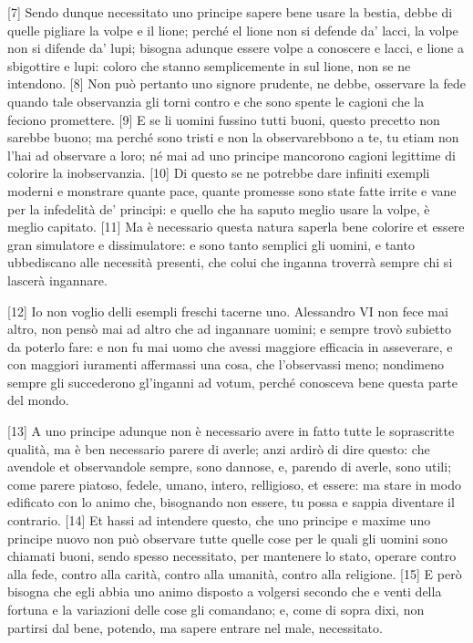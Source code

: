 {[}7{]} Sendo dunque necessitato uno principe sapere bene usare la
bestia, debbe di quelle pigliare la volpe e il lione; perché el lione
non si defende da' lacci, la volpe non si difende da' lupi; bisogna
adunque essere volpe a conoscere e lacci, e lione a sbigottire e lupi:
coloro che stanno semplicemente in sul lione, non se ne intendono.
{[}8{]} Non può pertanto uno signore prudente, ne debbe, osservare la
fede quando tale observanzia gli torni contro e che sono spente le
cagioni che la feciono promettere. {[}9{]} E se li uomini fussino tutti
buoni, questo precetto non sarebbe buono; ma perché sono tristi e non la
observarebbono a te, tu etiam non l'hai ad observare a loro; né mai ad
uno principe mancorono cagioni legittime di colorire la inobservanzia.
{[}10{]} Di questo se ne potrebbe dare infiniti exempli moderni e
monstrare quante pace, quante promesse sono state fatte irrite e vane
per la infedelità de' principi: e quello che ha saputo meglio usare la
volpe, è meglio capitato. {[}11{]} Ma è necessario questa natura saperla
bene colorire et essere gran simulatore e dissimulatore: e sono tanto
semplici gli uomini, e tanto ubbediscano alle necessità presenti, che
colui che inganna troverrà sempre chi si lascerà ingannare.

{[}12{]} Io non voglio delli esempli freschi tacerne uno. Alessandro VI
non fece mai altro, non pensò mai ad altro che ad ingannare uomini; e
sempre trovò subietto da poterlo fare: e non fu mai uomo che avessi
maggiore efficacia in asseverare, e con maggiori iuramenti affermassi
una cosa, che l'observassi meno; nondimeno sempre gli succederono
gl'inganni ad votum, perché conosceva bene questa parte del mondo.

{[}13{]} A uno principe adunque non è necessario avere in fatto tutte le
soprascritte qualità, ma è ben necessario parere di averle; anzi ardirò
di dire questo: che avendole et observandole sempre, sono dannose, e,
parendo di averle, sono utili; come parere piatoso, fedele, umano,
intero, relligioso, et essere: ma stare in modo edificato con lo animo
che, bisognando non essere, tu possa e sappia diventare il contrario.
{[}14{]} Et hassi ad intendere questo, che uno principe e maxime uno
principe nuovo non può observare tutte quelle cose per le quali gli
uomini sono chiamati buoni, sendo spesso necessitato, per mantenere lo
stato, operare contro alla fede, contro alla carità, contro alla
umanità, contro alla religione. {[}15{]} E però bisogna che egli abbia
uno animo disposto a volgersi secondo che e venti della fortuna e la
variazioni delle cose gli comandano; e, come di sopra dixi, non partirsi
dal bene, potendo, ma sapere entrare nel male, necessitato.

